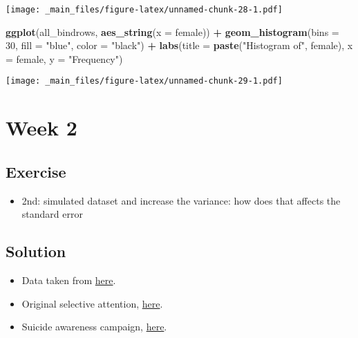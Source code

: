 \documentclass[
]{book}
\newenvironment{Shaded}{\begin{snugshade}}{\end{snugshade}}
\newcommand{\AttributeTok}[1]{\textcolor[rgb]{0.13,0.29,0.53}{#1}}
\newcommand{\DecValTok}[1]{\textcolor[rgb]{0.00,0.00,0.81}{#1}}
\newcommand{\FunctionTok}[1]{\textcolor[rgb]{0.13,0.29,0.53}{\textbf{#1}}}
\newcommand{\NormalTok}[1]{#1}
\newcommand{\SpecialCharTok}[1]{\textcolor[rgb]{0.81,0.36,0.00}{\textbf{#1}}}
\newcommand{\StringTok}[1]{\textcolor[rgb]{0.31,0.60,0.02}{#1}}
\providecommand{\tightlist}{%
  \setlength{\itemsep}{0pt}\setlength{\parskip}{0pt}}
\begin{document}
\texttt{[image: \_main\_files/figure-latex/unnamed-chunk-28-1.pdf]}

\begin{Shaded}
\begin{Highlighting}[]
\FunctionTok{ggplot}\NormalTok{(all\_bindrows, }\FunctionTok{aes\_string}\NormalTok{(}\AttributeTok{x =} \StringTok{\textquotesingle{}female\textquotesingle{}}\NormalTok{)) }\SpecialCharTok{+} 
      \FunctionTok{geom\_histogram}\NormalTok{(}\AttributeTok{bins =} \DecValTok{30}\NormalTok{, }\AttributeTok{fill =} \StringTok{"blue"}\NormalTok{, }\AttributeTok{color =} \StringTok{"black"}\NormalTok{) }\SpecialCharTok{+}
      \FunctionTok{labs}\NormalTok{(}\AttributeTok{title =} \FunctionTok{paste}\NormalTok{(}\StringTok{"Histogram of"}\NormalTok{, }\StringTok{\textquotesingle{}female\textquotesingle{}}\NormalTok{), }\AttributeTok{x =} \StringTok{\textquotesingle{}female\textquotesingle{}}\NormalTok{, }\AttributeTok{y =} \StringTok{"Frequency"}\NormalTok{)}
\end{Highlighting}
\end{Shaded}

\texttt{[image: \_main\_files/figure-latex/unnamed-chunk-29-1.pdf]}

\hypertarget{week-2}{%
\chapter{Week 2}\label{week-2}}

\hypertarget{exercise}{%
\section{Exercise}\label{exercise}}

\begin{itemize}
\tightlist
\item
  2nd: simulated dataset and increase the variance: how does that affects the standard error
\end{itemize}

\hypertarget{solution}{%
\section{Solution}\label{solution}}

\begin{itemize}
\item
  Data taken from \href{https://communities.sas.com/t5/Graphics-Programming/Fun-With-SAS-ODS-Graphics-Don-t-Miss-the-Gorilla-in-the-Data/td-p/697286}{here}.
\item
  Original selective attention, \href{https://www.youtube.com/watch?v=vJG698U2Mvo}{here}.
\item
  Suicide awareness campaign, \href{https://www.youtube.com/watch?v=Lw-YPKR0grk}{here}.
\end{itemize}
\end{document}
